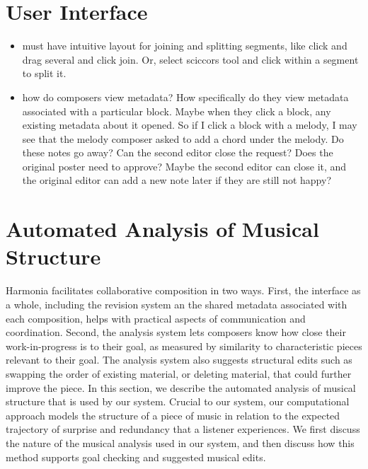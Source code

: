 \documentclass[final,authoryear,5p,times,twocolumn]{elsarticle}
\begin{document}
\section{User Interface}

 
 \begin{itemize}

 \item must have intuitive layout for joining and splitting segments, like click and drag several and click join. Or, select sciccors tool and click within a segment to split it.
 
 \item how do composers view metadata? How specifically do they view metadata associated with a particular block. Maybe when they click a block, any existing metadata about it opened. So if I click a block with a melody, I may see that the melody composer asked to add a chord under the melody. Do these notes go away? Can the second editor close the request? Does the original poster need to approve? Maybe the second editor can close it, and the original editor can add a new note later if they are still not happy?
 
 \end{itemize}

\section{Automated Analysis of Musical Structure}

Harmonia facilitates collaborative composition in two ways. First, the interface as a whole, including the revision system an the shared metadata associated with each composition, helps with practical aspects of communication and coordination. Second, the analysis system lets composers know how close their work-in-progress is to their goal, as measured by similarity to characteristic pieces relevant to their goal. The analysis system also suggests structural edits such as swapping the order of existing material, or deleting material, that could further improve the piece. In this section, we describe the automated analysis of musical structure that is used by our system. Crucial to our system, our computational approach models the structure of a piece of music in relation to the expected trajectory of surprise and redundancy that a listener experiences. We first discuss the nature of the musical analysis used in our system, and then discuss how this method supports goal checking and suggested musical edits.
\end{document}

